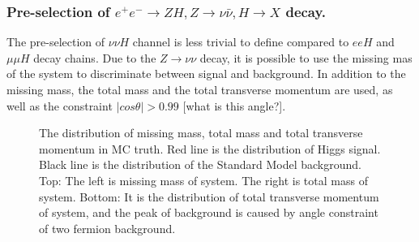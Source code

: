 \documentclass[11pt,a4paper]{cepcnote}
\begin{document}
\subsubsection{Pre-selection of $e^+e^- \rightarrow ZH, Z\rightarrow \nu\bar{\nu}, H\rightarrow X$ decay.}
The pre-selection of $\nu\nu H$ channel is less trivial to define compared to
$eeH$ and $\mu\mu H$ decay chains. Due to the $Z\to\nu\nu$ decay, it is 
possible to use the missing mas of the system to discriminate between signal 
and background. In addition to the missing mass, the total mass
and the total transverse momentum are used, as well as the constraint 
$|cos\theta| > 0.99$ {\color{red}[what is this angle?]}.
\begin{figure}[H]
	\centering
	\caption[]{The distribution of missing mass, total mass and total transverse momentum in MC truth. 
	Red line is the distribution of Higgs signal. Black line is the distribution of the Standard Model background.
	Top: The left is missing mass of system. The right is total mass of system.
	Bottom: It is the distribution of total transverse momentum of system, and the peak of background is caused by angle constraint of 
	two fermion background.}
	\label{fig:nnHfilter}
\end{figure}
\end{document}
